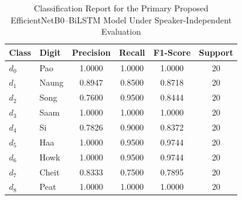 \documentclass[journal]{IEEEtran}
\begin{document}
\begin{table}[!htbp]
    \centering
    \caption{Classification Report for the Primary Proposed EfficientNetB0--BiLSTM Model Under Speaker-Independent Evaluation \cite{sokolova2009systematic,nemani2023speakerindependent}}
    \label{tab:classification_report}
    \footnotesize
    \setlength{\tabcolsep}{3.8pt}
    \renewcommand{\arraystretch}{1.10}
    \begin{tabular}{llcccc}
        \hline
        \textbf{Class}                                & \textbf{Digit}                                 & \textbf{Precision} & \textbf{Recall} & \textbf{F1-Score} & \textbf{Support} \\
        \hline
        $d_0$                                         & Pao                                            & 1.0000             & 1.0000          & 1.0000            & 20               \\
        $d_1$                                         & Naung                                          & 0.8947             & 0.8500          & 0.8718            & 20               \\
        $d_2$                                         & Song                                           & 0.7600             & 0.9500          & 0.8444            & 20               \\
        $d_3$                                         & Saam                                           & 1.0000             & 1.0000          & 1.0000            & 20               \\
        $d_4$                                         & Si                                             & 0.7826             & 0.9000          & 0.8372            & 20               \\
        $d_5$                                         & Haa                                            & 1.0000             & 0.9500          & 0.9744            & 20               \\
        $d_6$                                         & Howk                                           & 1.0000             & 0.9500          & 0.9744            & 20               \\
        $d_7$                                         & Cheit                                          & 0.8333             & 0.7500          & 0.7895            & 20               \\
        $d_8$                                         & Peat                                           & 1.0000             & 1.0000          & 1.0000            & 20               \\

\end{tabular}
\end{table}
\end{document}
